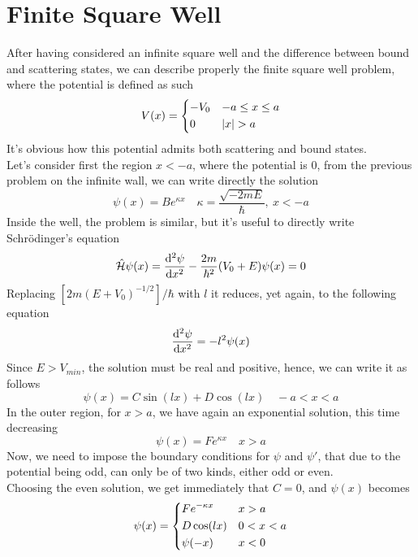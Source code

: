 \documentclass[../qm.tex]{subfiles}
\begin{document}
	\section{Finite Square Well}
	After having considered an infinite square well and the difference between bound and scattering states, we can describe properly the finite square well problem, where the potential is defined as such
	\begin{equation*}
		V(x)=\begin{dcases}
			-V_0&-a\le x\le a\\
			0&\abs{x}>a
		\end{dcases}
	\end{equation*}
	It's obvious how this potential admits both scattering and bound states.\\
	Let's consider first the region $x<-a$, where the potential is $0$, from the previous problem on the infinite wall, we can write directly the solution
	\begin{equation}
		\psi(x)=Be^{\kappa x}\quad \kappa=\frac{\sqrt{-2mE}}{\hbar},\ x<-a
		\label{eq:solution1nega}
	\end{equation}
	Inside the well, the problem is similar, but it's useful to directly write Schrödinger's equation
	\begin{equation}
		\opr{\ham}\psi(x)=\derivative[2]{\psi}{x}-\frac{2m}{\hbar^2}(V_0+E)\psi(x)=0
		\label{eq:insidewellschr}
	\end{equation}
	Replacing $[2m(E+V_0)^{-1/2}]/\hbar$ with $l$ it reduces, yet again, to the following equation
	\begin{equation*}
		\derivative[2]{\psi}{x}=-l^2\psi(x)
	\end{equation*}
	Since $E>V_{min}$, the solution must be real and positive, hence, we can write it as follows
	\begin{equation}
		\psi(x)=C\sin(lx)+D\cos(lx)\quad -a<x<a
		\label{eq:insidewellsolution}
	\end{equation}
	In the outer region, for $x>a$, we have again an exponential solution, this time decreasing
	\begin{equation}
		\psi(x)=Fe^{\kappa x}\quad x>a
		\label{eq:solution2pos}
	\end{equation}
	Now, we need to impose the boundary conditions for $\psi$ and $\psi'$, that due to the potential being odd, can only be of two kinds, either odd or even.\\
	Choosing the even solution, we get immediately that $C=0$, and $\psi(x)$ becomes
	\begin{equation}
		\psi(x)=\begin{dcases}
			Fe^{-\kappa x}&x>a\\
			D\cos(lx)&0<x<a\\
			\psi(-x)&x<0
		\end{dcases}
		\label{eq:almostfinalpsisquarewell}
	\end{equation}
\end{document}
